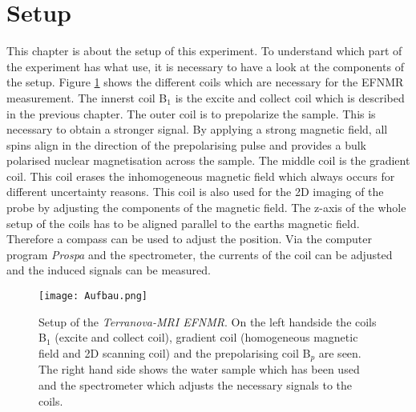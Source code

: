 \section{Setup}
\label{sec:Aufbau}
This chapter is about the setup of this experiment. To understand which part of the experiment has what use, it is necessary to have a look at the components of the setup.\newline
Figure \ref{fig:Aufbau} shows the different coils which are necessary for the EFNMR measurement. The innerst coil B$_1$ is the excite and collect coil which is described in the previous chapter. The outer coil is to prepolarize the sample. This is necessary to obtain a stronger signal. By applying a strong magnetic field, all spins align in the direction of the prepolarising pulse and provides a bulk polarised nuclear magnetisation across the sample. The middle coil is the gradient coil. This coil erases the inhomogeneous magnetic field which always occurs for different uncertainty reasons. This coil is also used for the 2D imaging of the probe by adjusting the components of the magnetic field. The z-axis of the whole setup of the coils has to be aligned parallel to the earths magnetic field. Therefore a compass can be used to adjust the position. Via the computer program \textit{Prospa} and the spectrometer, the currents of the coil can be adjusted and the induced signals can be measured.
\begin{figure}[H]
    \centering
    \texttt{[image: Aufbau.png]}   
    \caption[Setup of the \textit{Terranova-MRI EFNMR}. \cite{Bild}]{Setup of the \textit{Terranova-MRI EFNMR}. On the left handside the coils B$_1$ (excite and collect coil), gradient coil (homogeneous magnetic field and 2D scanning coil) and the prepolarising coil B$_p$ are seen. The right hand side shows the water sample which has been used and the spectrometer which adjusts the necessary signals to the coils. \cite{Bild}}
    \label{fig:Aufbau}
\end{figure}
